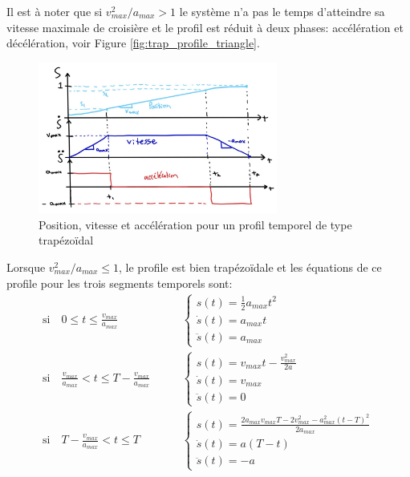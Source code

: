 Il est à noter que si $v_{max}^2/a_{max} > 1$ le système n'a pas le temps d'atteindre sa vitesse maximale de croisière et le profil est réduit à deux phases: accélération et décélération, voir Figure \ref{fig:trap_profile_triangle}.
\begin{figure}[ht]
	\centering
		\includegraphics[width=0.70\textwidth]{fig/trap_profile_all.jpg}
	\caption{Position, vitesse et accélération pour un profil temporel de type trapézoïdal}
	\label{fig:trap_profile_speed_all}
\end{figure}
%
Lorsque $v_{max}^2/a_{max}  \leq 1$, le profile est bien trapézoïdale et les équations de ce profile pour les trois segments temporels sont:
\begin{align}
\text{si} \quad 0 \leq t \leq \frac{v_{max}}{a_{max}} \quad & \quad \left\{ \begin{array}{l}
s(t)= \frac{1}{2} a_{max} t^2
\\
\dot{s}(t)= a_{max} t
\\
\ddot{s}(t) = a_{max}
\end{array}
\right. \\
\text{si} \quad \frac{v_{max}}{a_{max}} < t \leq T- \frac{v_{max}}{a_{max}} \quad & \quad \left\{ \begin{array}{l}
s(t)= v_{max} t -  \frac{v_{max}^2}{2a}
\\
\dot{s}(t)= v_{max}
\\
\ddot{s}(t) = 0
\end{array}
\right. \\
\text{si} \quad  T- \frac{v_{max}}{a_{max}}  < t \leq T \quad & \quad \left\{ \begin{array}{l}
s(t) = \frac{2 a_{max} v_{max} T - 2 v_{max}^2 - a_{max}^2(t-T)^2}{2 a_{max}}
\\
\dot{s}(t)= a(T - t)
\\
\ddot{s}(t) = -a
\end{array}
\right.
\end{align}

